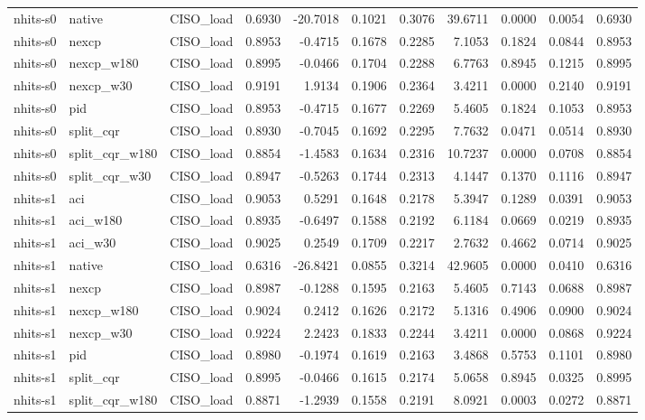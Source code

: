 \begin{tabular}{lllrrrrrrrr}
nhits-s0 & native & CISO_load & 0.6930 & -20.7018 & 0.1021 & 0.3076 & 39.6711 & 0.0000 & 0.0054 & 0.6930 \\
nhits-s0 & nexcp & CISO_load & 0.8953 & -0.4715 & 0.1678 & 0.2285 & 7.1053 & 0.1824 & 0.0844 & 0.8953 \\
nhits-s0 & nexcp_w180 & CISO_load & 0.8995 & -0.0466 & 0.1704 & 0.2288 & 6.7763 & 0.8945 & 0.1215 & 0.8995 \\
nhits-s0 & nexcp_w30 & CISO_load & 0.9191 & 1.9134 & 0.1906 & 0.2364 & 3.4211 & 0.0000 & 0.2140 & 0.9191 \\
nhits-s0 & pid & CISO_load & 0.8953 & -0.4715 & 0.1677 & 0.2269 & 5.4605 & 0.1824 & 0.1053 & 0.8953 \\
nhits-s0 & split_cqr & CISO_load & 0.8930 & -0.7045 & 0.1692 & 0.2295 & 7.7632 & 0.0471 & 0.0514 & 0.8930 \\
nhits-s0 & split_cqr_w180 & CISO_load & 0.8854 & -1.4583 & 0.1634 & 0.2316 & 10.7237 & 0.0000 & 0.0708 & 0.8854 \\
nhits-s0 & split_cqr_w30 & CISO_load & 0.8947 & -0.5263 & 0.1744 & 0.2313 & 4.1447 & 0.1370 & 0.1116 & 0.8947 \\
nhits-s1 & aci & CISO_load & 0.9053 & 0.5291 & 0.1648 & 0.2178 & 5.3947 & 0.1289 & 0.0391 & 0.9053 \\
nhits-s1 & aci_w180 & CISO_load & 0.8935 & -0.6497 & 0.1588 & 0.2192 & 6.1184 & 0.0669 & 0.0219 & 0.8935 \\
nhits-s1 & aci_w30 & CISO_load & 0.9025 & 0.2549 & 0.1709 & 0.2217 & 2.7632 & 0.4662 & 0.0714 & 0.9025 \\
nhits-s1 & native & CISO_load & 0.6316 & -26.8421 & 0.0855 & 0.3214 & 42.9605 & 0.0000 & 0.0410 & 0.6316 \\
nhits-s1 & nexcp & CISO_load & 0.8987 & -0.1288 & 0.1595 & 0.2163 & 5.4605 & 0.7143 & 0.0688 & 0.8987 \\
nhits-s1 & nexcp_w180 & CISO_load & 0.9024 & 0.2412 & 0.1626 & 0.2172 & 5.1316 & 0.4906 & 0.0900 & 0.9024 \\
nhits-s1 & nexcp_w30 & CISO_load & 0.9224 & 2.2423 & 0.1833 & 0.2244 & 3.4211 & 0.0000 & 0.0868 & 0.9224 \\
nhits-s1 & pid & CISO_load & 0.8980 & -0.1974 & 0.1619 & 0.2163 & 3.4868 & 0.5753 & 0.1101 & 0.8980 \\
nhits-s1 & split_cqr & CISO_load & 0.8995 & -0.0466 & 0.1615 & 0.2174 & 5.0658 & 0.8945 & 0.0325 & 0.8995 \\
nhits-s1 & split_cqr_w180 & CISO_load & 0.8871 & -1.2939 & 0.1558 & 0.2191 & 8.0921 & 0.0003 & 0.0272 & 0.8871 \\

\end{tabular}
